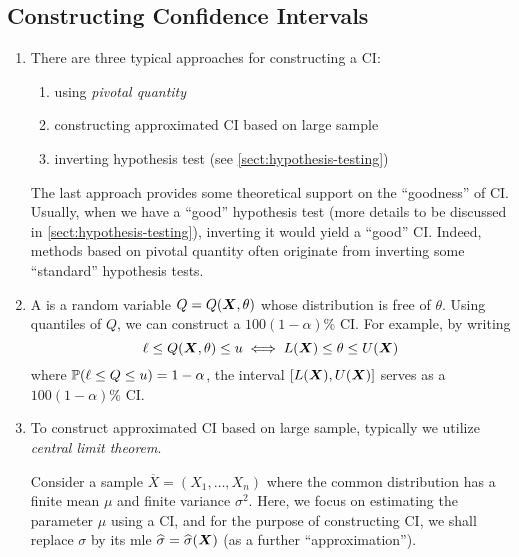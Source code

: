 \subsection{Constructing Confidence Intervals}
\begin{enumerate}
\item There are three typical approaches for constructing a CI:
\begin{enumerate}
\item using \emph{pivotal quantity}
\item constructing approximated CI based on large sample
\item inverting hypothesis test (see \cref{sect:hypothesis-testing})
\end{enumerate}
The last approach provides some theoretical support on the ``goodness'' of CI.
Usually, when we have a ``good'' hypothesis test (more details to be discussed
in \cref{sect:hypothesis-testing}), inverting it would yield a ``good'' CI.
Indeed, methods based on pivotal quantity often originate from inverting some
``standard'' hypothesis tests.

\item A  is a random variable \(Q=Q(\vb*{X},\theta)\)
whose distribution is free of \(\theta\). Using quantiles of \(Q\), we can
construct a \(100(1-\alpha)\%\) CI. For example, by writing
\[
\ell\le Q(\vb*{X},\theta)\le u\iff L(\vb*{X})\le \theta\le U(\vb*{X})
\]
where \(\mathbb{P}\qty(\ell\le Q\le u)=1-\alpha\), the interval
\([L(\vb*{X}),U(\vb*{X})]\) serves as a \(100(1-\alpha)\%\) CI.
\item To construct approximated CI based on large sample, typically we utilize
\emph{central limit theorem}.

Consider a sample \(\overline{X}=(X_1,\dotsc,X_n)\) where the common
distribution has a finite mean \(\mu\) and finite variance \(\sigma^2\). Here,
we focus on estimating the parameter \(\mu\) using a CI, and for the purpose of
constructing CI, we shall replace \(\sigma\) by its mle
\(\widehat{\sigma}=\widehat{\sigma}(\vb*{X})\) (as a further ``approximation'').


\end{enumerate}
